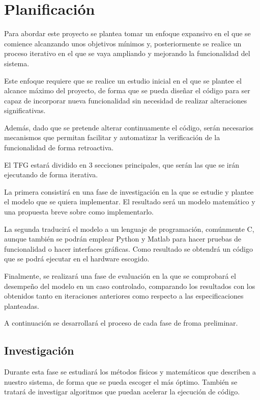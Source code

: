 \documentclass{sty/propuesta}
\begin{document}
\section{Planificación}

Para abordar este proyecto se plantea tomar un enfoque expansivo en el que se comience alcanzando unos objetivos mínimos y, posteriormente se realice un proceso iterativo en el que se vaya ampliando y mejorando la funcionalidad del sistema.

Este enfoque requiere que se realice un estudio inicial en el que se plantee el alcance máximo del proyecto, de forma que se pueda diseñar el código para ser capaz de incorporar nueva funcionalidad sin necesidad de realizar alteraciones significativas.

Además, dado que se pretende alterar continuamente el código, serán necesarios mecanismos que permitan facilitar y automatizar la verificación de la funcionalidad de forma retroactiva.

El TFG estará dividido en 3 secciones principales, que serán las que se irán ejecutando de forma iterativa.

La primera consistirá en una fase de investigación en la que se estudie y plantee el modelo que se quiera implementar. El resultado será un modelo matemático y una propuesta breve sobre como implementarlo.

La segunda traducirá el modelo a un lenguaje de programación, comúnmente C, aunque también se podrán emplear Python y Matlab para hacer pruebas de funcionalidad o hacer interfaces gráficas. Como resultado se obtendrá un código que se podrá ejecutar en el hardware escogido.

Finalmente, se realizará una fase de evaluación en la que se comprobará el desempeño del modelo en un caso controlado, comparando los resultados con los obtenidos tanto en iteraciones anteriores como respecto a las especificaciones planteadas.

A continuación se desarrollará el proceso de cada fase de froma preliminar.

\subsection{Investigación}

Durante esta fase se estudiará los métodos físicos y matemáticos que describen a nuestro sistema, de forma que se pueda escoger el más óptimo. También se tratará de investigar algoritmos que puedan acelerar la ejecución de código.
\end{document}
